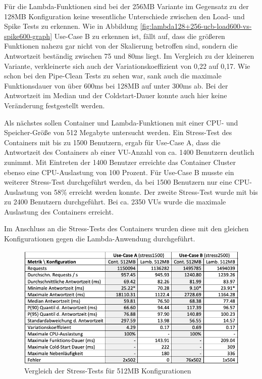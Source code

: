 Für die Lambda-Funktionen sind bei der 256MB Variante im Gegensatz zu der 128MB Konfiguration keine wesentliche Unterschiede zwischen den Load- und Spike Tests zu erkennen. Wie in Abbildung \ref{fig:lambda128+256-ucb-load600-vs-spike600-graph} Use-Case B zu erkennen ist, fällt auf, dass die größeren Funktionen nahezu gar nicht von der Skalierung betroffen sind, sondern die Antwortzeit beständig zwischen 75 und 80ms liegt. Im Vergleich zu der kleineren Variante, verkleinerte sich auch der Variationskoeffizient von 0,22 auf 0,17. Wie schon bei den Pipe-Clean Tests zu sehen war, sank auch die maximale Funktionsdauer von über 600ms bei 128MB auf unter 300ms ab. Bei der Antwortzeit im Median und der Coldstart-Dauer konnte auch hier keine Veränderung festgestellt werden.


Als nächstes sollen Container und Lambda-Funktionen mit einer CPU- und Speicher-Größe von 512 Megabyte untersucht werden. Ein Stress-Test des Containers mit bis zu 1500 Benutzern, ergab für Use-Case A, dass die Antwortzeit des Containers ab einer VU-Anzahl von ca. 1400 Benutzern deutlich zunimmt. Mit Eintreten der 1400 Benutzer erreichte das Container Cluster ebenso eine CPU-Auslastung von 100 Prozent. Für Use-Case B musste ein weiterer Stress-Test durchgeführt werden, da bei 1500 Benutzern nur eine CPU-Auslastung von 58\% erreicht werden konnte. Der zweite Stress-Test wurde mit bis zu 2400 Benutzern durchgeführt. Bei ca. 2350 VUs wurde die maximale Auslastung des Containers erreicht.

Im Anschluss an die Stress-Tests des Containers wurden diese mit den gleichen Konfigurationen gegen die Lambda-Anwendung durchgeführt.

\begin{figure}[H]
    \includegraphics[width=\textwidth]{img/512MB-stress-comparison.png}
    \caption[Vergleich der Stress-Tests für 512MB Konfigurationen]{Vergleich der Stress-Tests für 512MB Konfigurationen}
    \label{fig:512MB-stress-comparison}
\end{figure}

